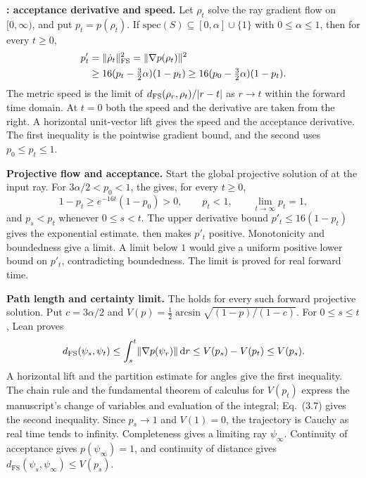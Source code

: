 \begin{theorem}
  \textbf{: acceptance derivative and speed.}
  Let $\rho_t$ solve the ray gradient flow on $[0,\infty)$, and put
  $p_t=p(\rho_t)$. If $\mathrm{spec}(S)\subseteq[0,\alpha]\cup\{1\}$
  with $0\le\alpha\le1$, then for every $t\ge0$,
  \[
    \begin{aligned}
      p'_t &= \lVert \dot\rho_t \rVert_{\rm FS}^{2}=\lVert \nabla p(\rho_t) \rVert^2 \\
            &\ge 16(p_t-\tfrac32\alpha)(1-p_t)
             \ge 16(p_0-\tfrac32\alpha)(1-p_t).
    \end{aligned}
  \]
  The metric speed is the limit of $d_{\rm FS}(\rho_r,\rho_t)/|r-t|$
  as $r\to t$ within the forward time domain. At $t=0$ both the speed and
  the derivative are taken from the right. A horizontal unit-vector lift
  gives the speed and the acceptance derivative. The first inequality is
  the pointwise gradient bound, and the second uses $p_0\le p_t\le1$.

  \textbf{Projective flow and acceptance.}
  Start the global projective solution of
   at the input ray.
  For $3\alpha/2<p_0<1$, the
  gives, for every $t\ge0$,
  \[
    1-p_t\ge e^{-16t}(1-p_0)>0,
    \qquad p_t<1,
    \qquad \lim_{t\to\infty}p_t=1,
  \]
  and $p_s<p_t$ whenever $0\le s<t$. The upper derivative bound
  $p'_t\le16(1-p_t)$ gives the exponential estimate.
   then makes $p'_t$ positive.
  Monotonicity and boundedness give a limit. A limit below $1$ would give
  a uniform positive lower bound on $p'_t$, contradicting boundedness.
  The limit is proved for real forward time.

  \textbf{Path length and certainty limit.}
  The 
  holds for every such forward projective solution. Put
  $c=3\alpha/2$ and $V(p)=\tfrac12\arcsin\sqrt{(1-p)/(1-c)}$.
  For $0\le s\le t$, Lean proves
  \[
    d_{\mathrm{FS}}(\psi_s,\psi_t)
    \le \int_s^t \lVert \nabla p(\psi_r) \rVert\,\mathrm{d}r
    \le V(p_s)-V(p_t)\le V(p_s).
  \]
  A horizontal lift and the partition estimate for angles give the first
  inequality. The chain rule and the fundamental theorem of calculus for
  $V(p_t)$ express the manuscript's change of variables and evaluation of
  the integral; Eq.~(3.7) gives the second inequality.
  Since $p_s\to1$ and $V(1)=0$, the trajectory is Cauchy as real time tends
  to infinity. Completeness gives a limiting ray $\psi_\infty$.
  Continuity of acceptance gives $p(\psi_\infty)=1$, and continuity of
  distance gives $d_{\mathrm{FS}}(\psi_s,\psi_\infty)\le V(p_s)$.


\end{theorem}
